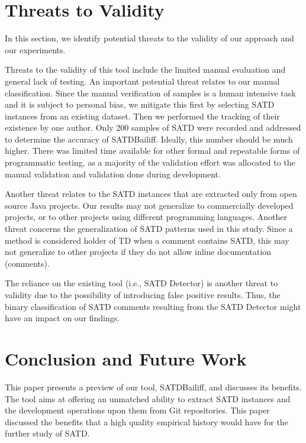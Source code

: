 \documentclass[3p]{elsarticle}
\newcommand{\approach}{SATDBailiff\xspace}
\begin{document}
\section{Threats to Validity}
\label{section:threats}

In this section, we identify potential threats to the validity of our approach and our experiments. 

Threats to the validity of this tool include the limited manual evaluation and general lack of testing. An important potential threat relates to our manual classification. Since the manual verification of samples is a human intensive task and it is subject to personal bias, we mitigate this first by selecting SATD instances from an existing dataset. Then we performed the tracking of their existence by one author. Only 200 samples of SATD were recorded and addressed to determine the accuracy of \approach. Ideally, this number should be much higher. There was limited time available for other formal and repeatable forms of programmatic testing, as a majority of the validation effort was allocated to the manual validation and validation done during development.

Another threat relates to the SATD instances that are extracted only from open source Java projects. Our results may not generalize to commercially developed projects, or to other projects using different programming languages. Another threat concerns the generalization of SATD patterns used in this study. Since a method is considered holder of TD when a comment contains SATD, this may not generalize to other projects if they do not allow inline documentation (comments). 

The reliance on the existing tool (i.e., SATD Detector) is another threat to validity due to the possibility of introducing false positive results. Thus, the binary classification of SATD comments resulting from the SATD Detector might have an impact on our findings.

\section{Conclusion and Future Work}
\label{section:conclusion}

This paper presents a preview of our tool, \approach , and discusses its benefits. The tool aims at offering an unmatched ability to extract SATD instances and the development operations upon them from Git repositories.
This paper discussed the benefits that a high quality empirical history would have for the further study of SATD.
\end{document}
